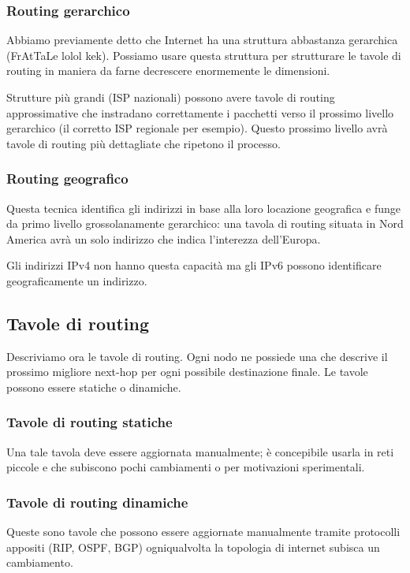         \subsubsection{Routing gerarchico}
            Abbiamo previamente detto che Internet ha una struttura abbastanza gerarchica (FrAtTaLe lolol kek). Possiamo usare questa struttura per strutturare le tavole di routing in maniera da farne decrescere enormemente le dimensioni.
            
            Strutture più grandi (ISP nazionali) possono avere tavole di routing approssimative che instradano correttamente i pacchetti verso il prossimo livello gerarchico (il corretto ISP regionale per esempio). Questo prossimo livello avrà tavole di routing più dettagliate che ripetono il processo.
            
        \subsubsection{Routing geografico}
            Questa tecnica identifica gli indirizzi in base alla loro locazione geografica e funge da primo livello grossolanamente gerarchico: una tavola di routing situata in Nord America avrà un solo indirizzo che indica l'interezza dell'Europa.
            
            Gli indirizzi IPv4 non hanno questa capacità ma gli IPv6 possono identificare geograficamente un indirizzo.
            
    \subsection{Tavole di routing}
        Descriviamo ora le tavole di routing. Ogni nodo ne possiede una che descrive il prossimo migliore next-hop per ogni possibile destinazione finale. Le tavole possono essere statiche o dinamiche.
        
        \subsubsection{Tavole di routing statiche}
            Una tale tavola deve essere aggiornata manualmente; è concepibile usarla in reti piccole e che subiscono pochi cambiamenti o per motivazioni sperimentali.
            
        \subsubsection{Tavole di routing dinamiche}
            Queste sono tavole che possono essere aggiornate manualmente tramite protocolli appositi (RIP, OSPF, BGP) ogniqualvolta la topologia di internet subisca un cambiamento.
            
